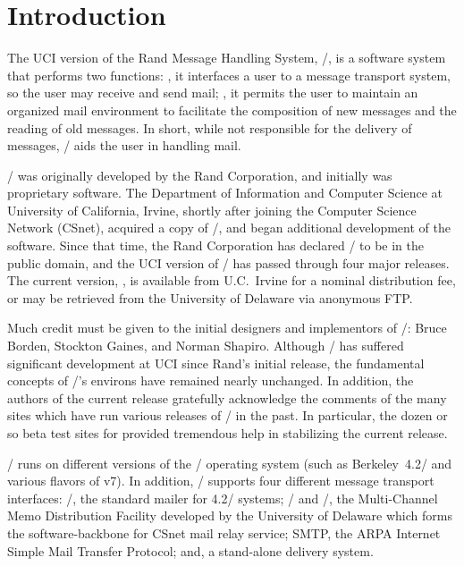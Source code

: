 
\banner

\section{Introduction}				%
The UCI version of the Rand Message Handling System, \MH/,
is a software system that performs two functions:
,
it interfaces a user to a message transport system,
so the user may receive and send mail;
,
it permits the user to maintain an organized mail environment to facilitate
the composition of new messages and the reading of old messages.
In short,
while not responsible for the delivery of messages,
\MH/ aids the user in handling mail.

\MH/ was originally developed by the Rand Corporation,
and initially was proprietary software.
The Department of Information and Computer Science at
University of California, Irvine,
shortly after joining the Computer Science Network (CSnet),
acquired a copy of \MH/,
and began additional development of the software.
Since that time,
the Rand Corporation has declared \MH/ to be in the public domain,
and the UCI version of \MH/ has passed through four major releases.
The current version, ,
is available from U.C.~Irvine for a nominal distribution fee,
or may be retrieved from the University of Delaware via anonymous FTP.

Much credit must be given to the initial designers and implementors of \MH/:
Bruce Borden, Stockton Gaines, and Norman Shapiro.
Although \MH/ has suffered significant development at UCI
since Rand's initial release,
the fundamental concepts of \MH/'s environs have remained nearly unchanged.
In addition,
the authors of the current release gratefully acknowledge the comments of the
many sites which have run various releases of \MH/ in the past.
In particular,
the dozen or so beta test sites for 
provided tremendous help in stabilizing the current release.

\MH/ runs on different versions of the \unix/ operating system
(such as Berkeley~4.2\bsd/ and various flavors of v7).
In addition,
\MH/ supports four different message transport interfaces:
\SendMail/\cite{EAllm83},
the standard mailer for 4.2\bsd/ systems;
\MMDF/\cite{DCroc79} and \MMDFII/\cite{DKing84},
the Multi-Channel Memo Distribution Facility developed by the University of
Delaware
which forms the software-backbone for CSnet\cite{DCome83} mail relay service;
SMTP,
the ARPA Internet Simple Mail Transfer Protocol\cite{SMTP};
and,
a stand-alone delivery system.

